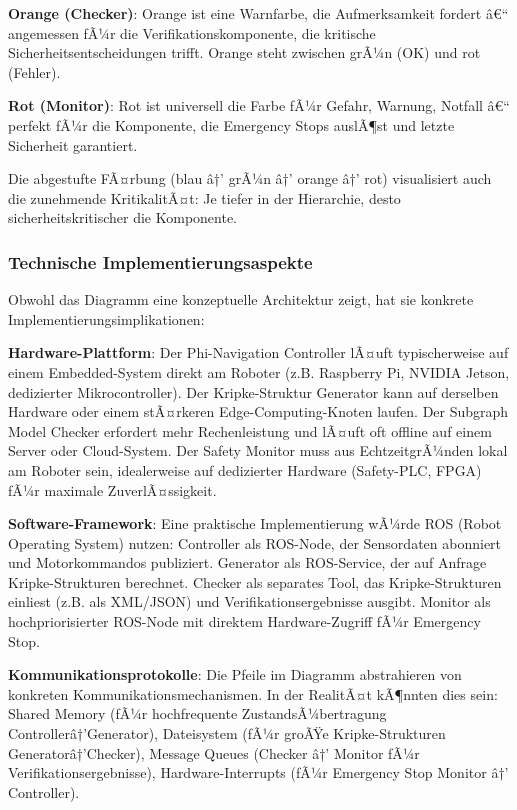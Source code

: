 ﻿\documentclass[a4paper,12pt]{article}
\theoremstyle{definition}
\begin{document}
\textbf{Orange (Checker)}: Orange ist eine Warnfarbe, die Aufmerksamkeit fordert â€“ angemessen fÃ¼r die Verifikationskomponente, die kritische Sicherheitsentscheidungen trifft. Orange steht zwischen grÃ¼n (OK) und rot (Fehler).

\textbf{Rot (Monitor)}: Rot ist universell die Farbe fÃ¼r Gefahr, Warnung, Notfall â€“ perfekt fÃ¼r die Komponente, die Emergency Stops auslÃ¶st und letzte Sicherheit garantiert.

Die abgestufte FÃ¤rbung (blau â†’ grÃ¼n â†’ orange â†’ rot) visualisiert auch die zunehmende KritikalitÃ¤t: Je tiefer in der Hierarchie, desto sicherheitskritischer die Komponente.

\subsubsection{Technische Implementierungsaspekte}

Obwohl das Diagramm eine konzeptuelle Architektur zeigt, hat sie konkrete Implementierungsimplikationen:

\textbf{Hardware-Plattform}: Der Phi-Navigation Controller lÃ¤uft typischerweise auf einem Embedded-System direkt am Roboter (z.B. Raspberry Pi, NVIDIA Jetson, dedizierter Mikrocontroller). Der Kripke-Struktur Generator kann auf derselben Hardware oder einem stÃ¤rkeren Edge-Computing-Knoten laufen. Der Subgraph Model Checker erfordert mehr Rechenleistung und lÃ¤uft oft offline auf einem Server oder Cloud-System. Der Safety Monitor muss aus EchtzeitgrÃ¼nden lokal am Roboter sein, idealerweise auf dedizierter Hardware (Safety-PLC, FPGA) fÃ¼r maximale ZuverlÃ¤ssigkeit.

\textbf{Software-Framework}: Eine praktische Implementierung wÃ¼rde ROS (Robot Operating System) nutzen: Controller als ROS-Node, der Sensordaten abonniert und Motorkommandos publiziert. Generator als ROS-Service, der auf Anfrage Kripke-Strukturen berechnet. Checker als separates Tool, das Kripke-Strukturen einliest (z.B. als XML/JSON) und Verifikationsergebnisse ausgibt. Monitor als hochpriorisierter ROS-Node mit direktem Hardware-Zugriff fÃ¼r Emergency Stop.

\textbf{Kommunikationsprotokolle}: Die Pfeile im Diagramm abstrahieren von konkreten Kommunikationsmechanismen. In der RealitÃ¤t kÃ¶nnten dies sein: Shared Memory (fÃ¼r hochfrequente ZustandsÃ¼bertragung Controllerâ†’Generator), Dateisystem (fÃ¼r groÃŸe Kripke-Strukturen Generatorâ†’Checker), Message Queues (Checker â†’ Monitor fÃ¼r Verifikationsergebnisse), Hardware-Interrupts (fÃ¼r Emergency Stop Monitor â†’ Controller).
\end{document}
